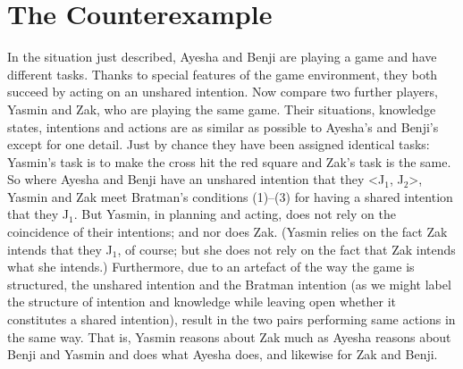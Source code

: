\documentclass[12pt,\papersize]{extarticle}
\begin{document}
%



\section{The Counterexample}

In the situation just described,
Ayesha and Benji are playing a game and have different tasks.
Thanks to special features of the game environment, they both succeed by acting on an unshared intention.
Now compare two further players, Yasmin and Zak, who are playing the same game. 
Their situations, knowledge states, intentions and actions are as similar as possible to Ayesha's and Benji's except for one detail.
Just by chance they have been assigned identical tasks: Yasmin's task is to make the cross hit the red square and Zak's task is the same.
So where Ayesha and Benji have an unshared intention that they <J$_1$, J$_2$>,
Yasmin and Zak meet Bratman's conditions (1)--(3) for having a shared intention that they J$_1$.  
But Yasmin, in planning and acting, does not rely on the coincidence of their intentions; and nor does Zak.
(Yasmin relies on the fact Zak intends that they J$_1$, of course; but she does not rely on the fact that Zak intends what she intends.)
Furthermore, due to an artefact of the way the game is structured,
the unshared intention and the Bratman intention (as we might label the structure of intention and knowledge while leaving open whether it constitutes a shared intention), result in the two pairs performing same actions in the same way.
That is, Yasmin reasons about Zak much as Ayesha reasons about Benji and Yasmin and does what Ayesha does, and likewise for Zak and Benji. 
\end{document}
